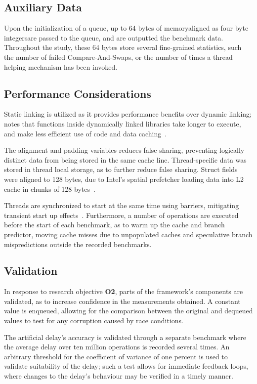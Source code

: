 \subsection{Auxiliary Data}
Upon the initialization of a queue, up to 64 bytes of memory\textemdash aligned as four
byte integers\textemdash are passed to the queue, and are outputted
the benchmark data. Throughout the study, these 64
bytes store several fine-grained statistics, such the number of failed Compare-And-Swaps,
or the number of times a thread helping mechanism has been invoked.

\subsection{Performance Considerations}
Static linking is utilized as it provides performance benefits over dynamic
linking; \citeauthor{fog2020optimizing} notes that functions inside dynamically
linked libraries take longer to execute, and make less efficient use of code
and data caching~\citep[Section~14.11]{fog2020optimizing}.

The alignment and padding variables reduces false sharing, preventing logically
distinct data from being stored in the same cache line.
Thread-specific data was stored in thread local storage, as to further reduce
false sharing. Struct fields were aligned to 128 bytes, due to
Intel's spatial prefetcher loading data into L2
cache in chunks of 128 bytes~\citep[Section~E.2.5.4]{intelmanualoptimization}.

Threads are synchronized to start at the same time using
barriers, mitigating transient start up effects~\citep{hoffman2007baskets}.
Furthermore, a number of operations are executed before the start of each
benchmark, as to warm up the cache and branch predictor, moving cache misses
due to unpopulated caches and speculative branch mispredictions outside the
recorded benchmarks.

\subsection{Validation\label{sec:design_and_implementation_validation}}
In response to research objective \textbf{O2}, parts of the framework's
components are validated, as to increase confidence in the measurements
obtained. A constant value is enqueued, allowing for the comparison
between the original and dequeued values to test for any corruption caused by race conditions. 

The artificial delay's accuracy is validated through a separate
benchmark where the average delay over ten million operations is recorded several times.
An arbitrary threshold for the coefficient of variance of one percent is used
to validate suitability of the delay; such a test allows for immediate feedback
loops, where changes to the delay's behaviour may be verified in a timely
manner.

